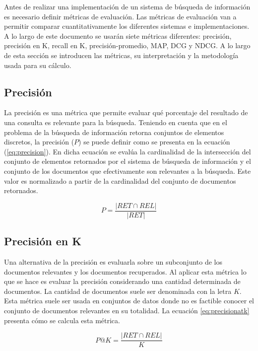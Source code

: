 Antes de realizar una implementación de un sistema de búsqueda de información es necesario definir métricas de evaluación. Las métricas de evaluación van a permitir comparar cuantitativamente los diferentes sistemas e implementaciones. A lo largo de este documento se usarán siete métricas diferentes: precisión, precisión en K, recall en K, precisión-promedio, MAP, DCG y NDCG. A lo largo de esta sección se introducen las métricas, su interpretación y la metodología usada para su cálculo. 

\subsection{Precisión}
La precisión es una métrica que permite evaluar qué porcentaje del resultado de una consulta es relevante para la búsqueda. Teniendo en cuenta que en el problema de la búsqueda de información retorna conjuntos de elementos discretos, la precisión ($P$) se puede definir como se presenta en la ecuación (\ref{eq:precision}). En dicha ecuación se evalúa la cardinalidad de la intersección del conjunto de elementos retornados por el sistema de búsqueda de información y el conjunto de los documentos que efectivamente son relevantes a la búsqueda. Este valor es normalizado a partir de la cardinalidad del conjunto de documentos retornados.

\begin{equation}
    P = \frac{|RET \cap REL|}{|RET|}
    \label{eq:precision}
\end{equation}

\subsection{Precisión en K}
Una alternativa de la precisión es evaluarla sobre un subconjunto de los documentos relevantes y los documentos recuperados. Al aplicar esta métrica lo que se hace es evaluar la precisión considerando una cantidad determinada de documentos. La cantidad de documentos suele ser denominada con la letra $K$. Esta métrica suele ser usada en conjuntos de datos donde no es factible conocer el conjunto de documentos relevantes en su totalidad. La ecuación \ref{eq:precisionatk} presenta cómo se calcula esta métrica.

\begin{equation}
    P@K = \frac{|RET \cap REL|}{K}
    \label{eq:precisionatk}
\end{equation}

